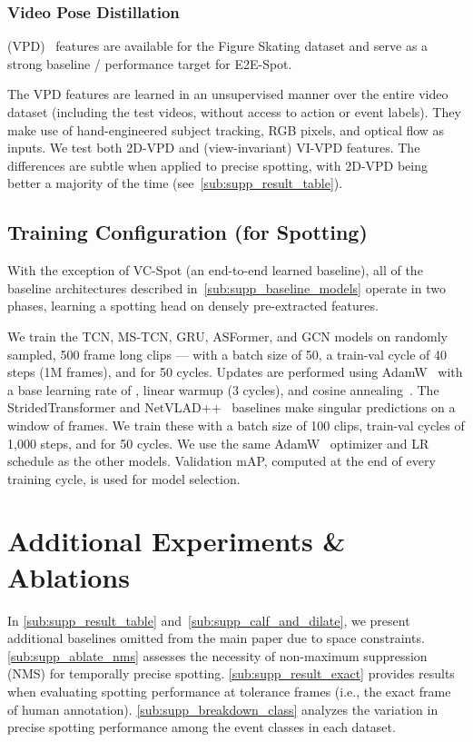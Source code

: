 \documentclass[runningheads]{llncs}
\newcommand{\OURMETHOD}{{E2E-Spot}\xspace}
\begin{document}
\subsubsection*{Video Pose Distillation} (VPD)~\cite{vpd} features are available for the Figure Skating dataset and serve as a strong baseline / performance target for \OURMETHOD.

The VPD features are learned in an unsupervised manner over the entire video dataset (including the test videos, without access to action or event labels).
They make use of hand-engineered subject tracking, RGB pixels, and optical flow as inputs.
We test both 2D-VPD and (view-invariant) VI-VPD features.
The differences are subtle when applied to precise spotting, with 2D-VPD being better a majority of the time (see~\autoref{sub:supp_result_table}).

\subsection{Training Configuration (for Spotting)}

With the exception of VC-Spot (an end-to-end learned baseline), all of the baseline architectures described in~\autoref{sub:supp_baseline_models} operate in two phases, learning a spotting head on densely pre-extracted features.

We train the TCN, MS-TCN, GRU, ASFormer, and GCN models on randomly sampled, 500 frame long clips --- with a batch size of 50, a train-val cycle of 40 steps (1M frames), and for 50 cycles.
Updates are performed using AdamW~\cite{adamw} with a base learning rate of , linear warmup (3 cycles), and cosine annealing~\cite{cosinelr}.
The StridedTransformer and NetVLAD++~\cite{netvladpp} baselines make singular predictions on a window of frames.
We train these with a batch size of 100 clips, train-val cycles of 1,000 steps, and for 50 cycles.
We use the same AdamW~\cite{adamw} optimizer and LR schedule as the other models.
Validation mAP, computed at the end of every training cycle, is used for model selection. 
\section{Additional Experiments \& Ablations}
\label{sec:supp_result}

In \autoref{sub:supp_result_table} and~\autoref{sub:supp_calf_and_dilate}, we present additional baselines omitted from the main paper due to space constraints.
\autoref{sub:supp_ablate_nms} assesses the necessity of non-maximum suppression (NMS) for temporally precise spotting.
\autoref{sub:supp_result_exact} provides results when evaluating spotting performance at tolerance  frames (i.e., the exact frame of human annotation).
\autoref{sub:supp_breakdown_class} analyzes the variation in precise spotting performance among the event classes in each dataset.
\end{document}
